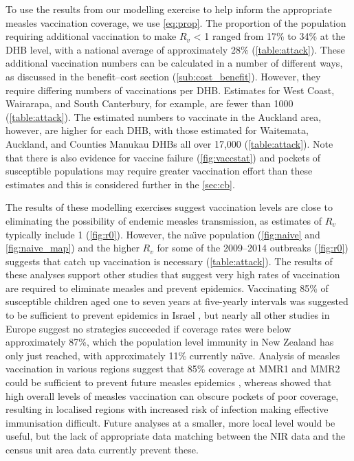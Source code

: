 \documentclass{article}
\begin{document}
To use the results from our modelling exercise to help inform the appropriate measles vaccination coverage, we use \autoref{eq:prop}. The proportion of the population requiring additional vaccination to make $R_v$ < 1 ranged from 17\% to 34\% at the DHB level, with a national average of approximately 28\% (\autoref{table:attack}). These additional vaccination numbers can be calculated in a number of different ways, as discussed in the benefit--cost section (\autoref{sub:cost_benefit}). However, they require differing numbers of vaccinations per DHB. Estimates for West Coast, Wairarapa, and South Canterbury, for example, are fewer than 1000 (\autoref{table:attack}). The estimated numbers to vaccinate in the Auckland area, however, are higher for each DHB, with those estimated for Waitemata, Auckland, and Counties Manukau DHBs all over 17,000  (\autoref{table:attack}). Note that there is also evidence for vaccine failure (\autoref{fig:vaccstat}) and pockets of susceptible populations \citep{glass4} may require greater vaccination effort than these estimates and this is considered further in the \autoref{sec:cb}.

The results of these modelling exercises suggest vaccination levels are close to eliminating the possibility of endemic measles transmission, as estimates of $R_v$ typically include 1 (\autoref{fig:r0}). However, the na\"{\i}ve population (\autoref{fig:naive} and \autoref{fig:naive_map}) and the higher $R_v$ for some of the 2009--2014 outbreaks (\autoref{fig:r0}) suggests that catch up vaccination is necessary (\autoref{table:attack}). The results of these analyses support other studies that suggest very high rates of vaccination are required to eliminate measles and prevent epidemics. Vaccinating 85\% of susceptible children aged one to seven years at five-yearly intervals was suggested to be sufficient to prevent epidemics in Israel \citep{agur93}, but nearly all other studies in Europe suggest no strategies succeeded if coverage rates were below approximately 87\%, which the population level immunity in New Zealand has only just reached, with approximately 11\% currently na\"{\i}ve. Analysis of measles vaccination in various regions suggest that 85\% coverage at MMR1 and MMR2 could be sufficient to prevent future measles epidemics \citep{agur93, babad95, edmunds0, gay98, wallinga1}, whereas \citep{glass4} showed that high overall levels of measles vaccination can obscure pockets of poor coverage, resulting in localised regions with increased risk of infection making effective immunisation difficult. Future analyses at a smaller, more local level would be useful, but the lack of appropriate data matching between the NIR data and the census unit area data currently prevent these.
\end{document}
